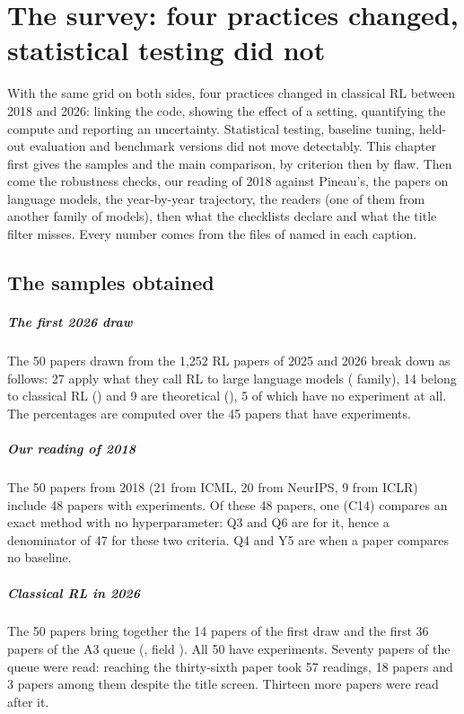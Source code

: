 \chapter{The survey: four practices changed, statistical testing did not}\label{chap:04-sondage-resultats}

With the same grid on both sides, four practices changed in classical RL between 2018 and 2026:
linking the code, showing the effect of a setting, quantifying the compute and reporting an
uncertainty. Statistical testing, baseline tuning, held-out evaluation and benchmark versions did not
move detectably. This chapter first gives the samples and the main comparison, by criterion then by
flaw. Then come the robustness checks, our reading of 2018 against Pineau's, the papers on language
models, the year-by-year trajectory, the readers (one of them from another family of models), then
what the checklists declare and what the title filter misses. Every number comes from the files
of  named in each caption.

\section{The samples obtained}\label{sec:sr-echantillons}

\paragraph{The first 2026 draw}
The 50 papers drawn from the 1,252 RL papers of 2025 and 2026 break down as follows: 27 apply what
they call RL to large language models ( family), 14 belong to classical RL ()
and 9 are theoretical (), 5 of which have no experiment at all. The percentages are
computed over the 45 papers that have experiments.

\paragraph{Our reading of 2018}
The 50 papers from 2018 (21 from ICML, 20 from NeurIPS, 9 from ICLR) include 48 papers with
experiments. Of these 48 papers, one (C14) compares an exact method with no hyperparameter: Q3 and Q6
are  for it, hence a denominator of 47 for these two criteria. Q4 and Y5 are  when a
paper compares no baseline.

\paragraph{Classical RL in 2026}
The 50 papers bring together the 14  papers of the first draw and the first 36
 papers of the A3 queue (, field ). All 50 have
experiments. Seventy papers of the queue were read: reaching the thirty-sixth  paper took
57 readings, 18  papers and 3  papers among them despite the title screen.
Thirteen more papers were read after it.

